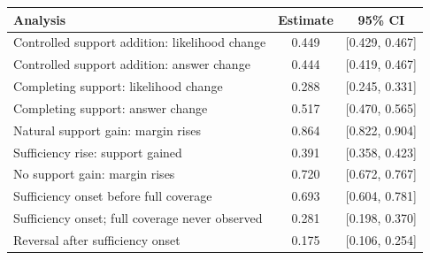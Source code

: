 \begin{tabular}{lcc}
\toprule
Analysis & Estimate & 95\% CI \\
\midrule
Controlled support addition: likelihood change & 0.449 & [0.429, 0.467] \\
Controlled support addition: answer change & 0.444 & [0.419, 0.467] \\
Completing support: likelihood change & 0.288 & [0.245, 0.331] \\
Completing support: answer change & 0.517 & [0.470, 0.565] \\
Natural support gain: margin rises & 0.864 & [0.822, 0.904] \\
Sufficiency rise: support gained & 0.391 & [0.358, 0.423] \\
No support gain: margin rises & 0.720 & [0.672, 0.767] \\
Sufficiency onset before full coverage & 0.693 & [0.604, 0.781] \\
Sufficiency onset; full coverage never observed & 0.281 & [0.198, 0.370] \\
Reversal after sufficiency onset & 0.175 & [0.106, 0.254] \\
\bottomrule
\end{tabular}
